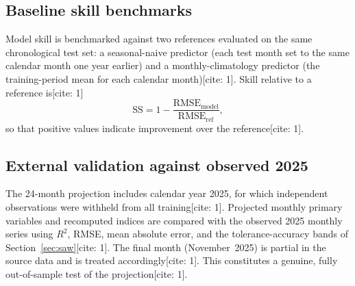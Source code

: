 \documentclass[pdflatex,sn-mathphys-ay]{sn-jnl}
\begin{document}
\subsection{Baseline skill benchmarks}\label{sec:baselines}
Model skill is benchmarked against two references evaluated on the same chronological test set: a seasonal-naive predictor (each test month set to the same calendar month one year earlier) and a monthly-climatology predictor (the training-period mean for each calendar month)[cite: 1]. Skill relative to a reference is[cite: 1]
\begin{equation}
\mathrm{SS}=1-\frac{\mathrm{RMSE}_{\text{model}}}{\mathrm{RMSE}_{\text{ref}}},
\label{eq:skill}
\end{equation}
so that positive values indicate improvement over the reference[cite: 1].

\subsection{External validation against observed 2025}\label{sec:validation}
The 24-month projection includes calendar year 2025, for which independent observations were withheld from all training[cite: 1]. Projected monthly primary variables and recomputed indices are compared with the observed 2025 monthly series using $R^{2}$, RMSE, mean absolute error, and the tolerance-accuracy bands of Section~\ref{sec:saw}[cite: 1]. The final month (November~2025) is partial in the source data and is treated accordingly[cite: 1]. This constitutes a genuine, fully out-of-sample test of the projection[cite: 1].
\end{document}
